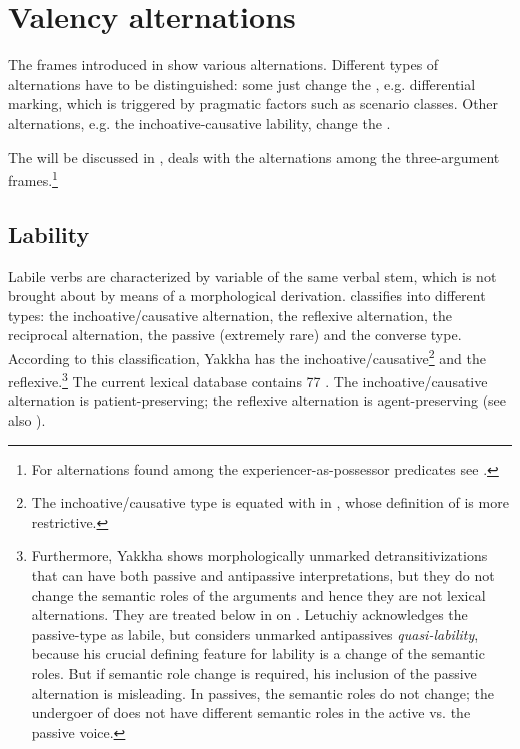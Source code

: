 \section{Valency alternations} \label{valclass}
 
The frames introduced in  show various alternations.  Different types of alternations have to be distinguished: some just change the , e.g. differential  marking, which is triggered by pragmatic factors such as  scenario classes. Other alternations, e.g. the inchoative-causative lability, change the . 

The   will be discussed  in ,    deals with the alternations among the three-argument frames.\footnote{For alternations found among the experiencer-as-possessor predicates see .} 


\subsection{Lability}\label{labile}

Labile verbs are characterized by variable  of the same verbal stem, which is not brought about by means of a morphological derivation. \citet[224]{Letuchiy2009Labile} classifies   into different types: the inchoative/causative alternation, the reflexive alternation, the reciprocal alternation, the passive (extremely rare) and the converse type. According to this classification, Yakkha has the inchoative/causative\footnote{The inchoative/causative type is equated with  in \citet{Haspelmath1993More}, whose definition of  is more restrictive.} and the reflexive.\footnote{Furthermore, Yakkha shows morphologically unmarked detransitivizations that can have both passive and antipassive interpretations, but they do not change the semantic roles of the arguments and hence they are not lexical alternations. They are treated below in  on . Letuchiy acknowledges the passive-type as labile, but considers unmarked antipassives \emph{quasi-lability}, because his crucial defining feature for lability is a change of the semantic roles. But if semantic role change is required, his inclusion of the passive alternation is misleading. In passives, the semantic roles do not change; the undergoer of  does not have different semantic roles in the active vs. the passive voice.} The current lexical database contains 77 . The inchoative/causative alternation is patient-preserving; the reflexive alternation is agent-preserving (see also \citealt[223]{Letuchiy2009Labile}). 

